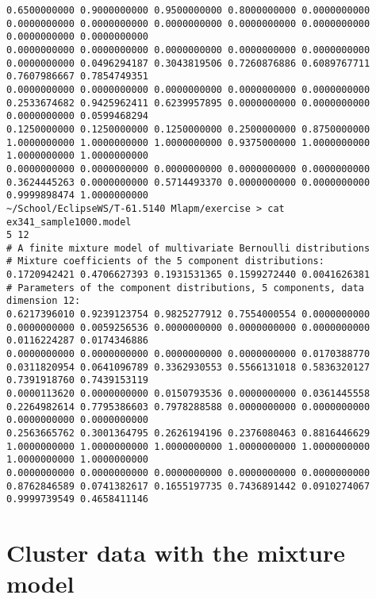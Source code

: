 \documentclass[a4paper,oneside,article]{memoir}
\begin{document}
\begin{lstlisting}
0.6500000000 0.9000000000 0.9500000000 0.8000000000 0.0000000000 0.0000000000 0.0000000000 0.0000000000 0.0000000000 0.0000000000 0.0000000000 0.0000000000 
0.0000000000 0.0000000000 0.0000000000 0.0000000000 0.0000000000 0.0000000000 0.0496294187 0.3043819506 0.7260876886 0.6089767711 0.7607986667 0.7854749351 
0.0000000000 0.0000000000 0.0000000000 0.0000000000 0.0000000000 0.2533674682 0.9425962411 0.6239957895 0.0000000000 0.0000000000 0.0000000000 0.0599468294 
0.1250000000 0.1250000000 0.1250000000 0.2500000000 0.8750000000 1.0000000000 1.0000000000 1.0000000000 0.9375000000 1.0000000000 1.0000000000 1.0000000000 
0.0000000000 0.0000000000 0.0000000000 0.0000000000 0.0000000000 0.3624445263 0.0000000000 0.5714493370 0.0000000000 0.0000000000 0.9999898474 1.0000000000 
~/School/EclipseWS/T-61.5140 Mlapm/exercise > cat ex341_sample1000.model 
5 12
# A finite mixture model of multivariate Bernoulli distributions
# Mixture coefficients of the 5 component distributions:
0.1720942421 0.4706627393 0.1931531365 0.1599272440 0.0041626381 
# Parameters of the component distributions, 5 components, data dimension 12:
0.6217396010 0.9239123754 0.9825277912 0.7554000554 0.0000000000 0.0000000000 0.0059256536 0.0000000000 0.0000000000 0.0000000000 0.0116224287 0.0174346886 
0.0000000000 0.0000000000 0.0000000000 0.0000000000 0.0170388770 0.0311820954 0.0641096789 0.3362930553 0.5566131018 0.5836320127 0.7391918760 0.7439153119 
0.0000113620 0.0000000000 0.0150793536 0.0000000000 0.0361445558 0.2264982614 0.7795386603 0.7978288588 0.0000000000 0.0000000000 0.0000000000 0.0000000000 
0.2563665762 0.3001364795 0.2626194196 0.2376080463 0.8816446629 1.0000000000 1.0000000000 1.0000000000 1.0000000000 1.0000000000 1.0000000000 1.0000000000 
0.0000000000 0.0000000000 0.0000000000 0.0000000000 0.0000000000 0.8762846589 0.0741382617 0.1655197735 0.7436891442 0.0910274067 0.9999739549 0.4658411146
\end{lstlisting}

\section{Cluster data with the mixture model}
\label{cluster}
\end{document}
